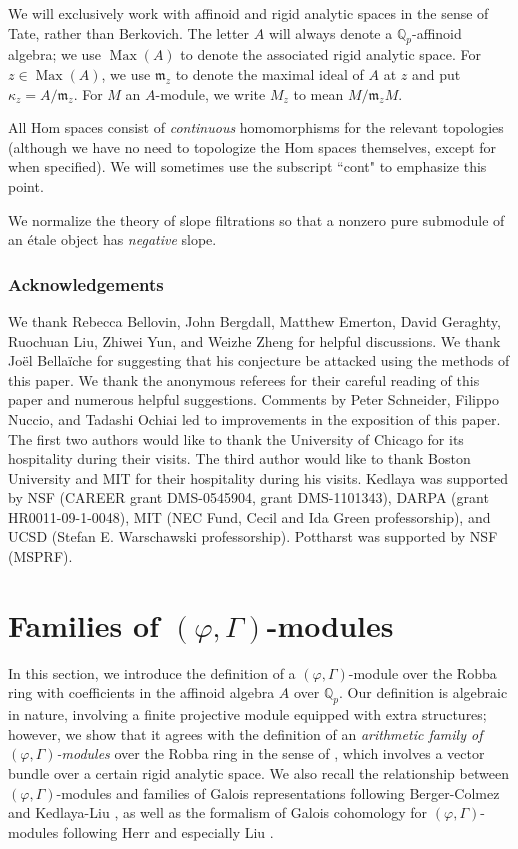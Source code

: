 \documentclass[12pt]{article}
\theoremstyle{definition}
\numberwithin{equation}{theorem}
\newcommand{\gothm}{\mathfrak{m}}
\newcommand{\QQ}{\mathbb{Q}}
\def\Qp{\QQ_p}
\DeclareMathOperator{\Max}{Max}
\begin{document}
We will exclusively work with affinoid and rigid analytic spaces in
the sense of Tate, rather than Berkovich.
The letter $A$ will always denote a $\QQ_p$-affinoid algebra;
we use $\Max(A)$ to denote the associated rigid analytic space.  For
$z \in \Max(A)$, we use $\gothm_z$ to denote the maximal ideal of $A$
at $z$ and put $\kappa_z = A /\gothm_z$.  For $M$ an $A$-module, we
write $M_z$ to mean $M/\gothm_zM$.

All Hom spaces consist of \emph{continuous} homomorphisms for the
relevant topologies (although we have no need to topologize the Hom
spaces themselves, except for when specified). We will sometimes use
the subscript ``cont" to emphasize this point.

We normalize the theory of slope filtrations so that a nonzero pure
submodule of an \'etale object has \emph{negative} slope.


\subsubsection*{Acknowledgements}
We thank Rebecca Bellovin, John Bergdall, Matthew Emerton, David
Geraghty, Ruochuan Liu, Zhiwei Yun, and Weizhe Zheng for helpful
discussions.  We thank Jo\"el Bella\"iche for suggesting that his
conjecture be attacked using the methods of this paper.  We thank the
anonymous referees for their careful reading of this paper and
numerous helpful suggestions.  Comments by Peter Schneider, Filippo
Nuccio, and Tadashi Ochiai led to improvements in the exposition of
this paper.  The first two authors would like to thank the University
of Chicago for its hospitality during their visits.  The third author
would like to thank Boston University and MIT for their hospitality
during his visits.  Kedlaya was supported by NSF (CAREER grant
DMS-0545904, grant DMS-1101343), DARPA (grant HR0011-09-1-0048), MIT
(NEC Fund, Cecil and Ida Green professorship), and UCSD (Stefan
E. Warschawski professorship).  Pottharst was supported by NSF
(MSPRF).


\section{Families of $(\varphi, \Gamma)$-modules}
\label{sec:family-phi-Gamma-modules}

In this section, we introduce the definition of a $(\varphi,
\Gamma)$-module over the Robba ring with coefficients in the affinoid
algebra $A$ over $\Qp$.  Our definition is algebraic in nature,
involving a finite projective module equipped with extra structures;
however, we show that it agrees with the definition of an
\emph{arithmetic family of $(\varphi,\Gamma)$-modules} over the Robba
ring in the sense of \cite{kiran-liu}, which involves a vector bundle
over a certain rigid analytic space.  We also recall the relationship
between $(\varphi, \Gamma)$-modules and families of Galois
representations following Berger-Colmez \cite{berger-colmez} and
Kedlaya-Liu \cite{kiran-liu}, as well as the formalism of Galois
cohomology for $(\varphi, \Gamma)$-modules following Herr and
especially Liu \cite{liu}.
\end{document}
